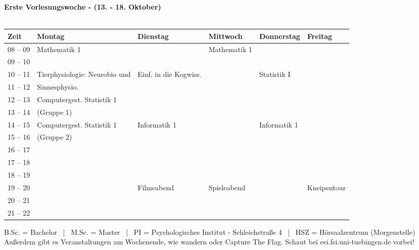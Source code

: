 \textbf{Erste Vorlesungswoche - (13. - 18. Oktober)}\\
\\
\begin{tabular}{|l|p{}|p{}|p{}|p{}|p{}|} \hline
	Zeit & Montag & Dienstag & Mittwoch & Donnerstag & Freitag \\ 
	\hline \hline
 08 -- 09 & \footnotesize{Mathematik 1} & & \footnotesize{Mathematik 1} & & \\ \cline{1-1}
 09 -- 10 & & & & & \\ \cline{1-5}
 10 -- 11 & \footnotesize{Tierphysiologie: Neurobio und} & \footnotesize{Einf. in die Kogwiss.} & & \footnotesize{Statistik I} & \\ \cline{1-1} 
 11 -- 12 & \footnotesize{Sinnesphysio.} &  & &  & \\ \cline{1-3} \cline{5-5}
 12 -- 13 & \footnotesize{Computergest. Statistik 1}& & & & \\ \cline{1-1}
 13 -- 14 & \footnotesize{(Gruppe 1)}& & & & \\ \cline{1-3} \cline{5-5}
 14 -- 15 & \footnotesize{Computergest. Statistik 1} & \footnotesize{Informatik 1} & & \footnotesize{Informatik 1} & \\  \cline {1-1}
 15 -- 16 & \footnotesize{(Gruppe 2)} &  & & & \\ \cline{1-3} \cline{5-5}
 16 -- 17 & & & & & \\ \cline{1-1}
 17 -- 18 & & & & & \\ \cline{1-1}
 18 -- 19 & & & & & \\ \cline{1-1}
 19 -- 20 & & \cellcolor{lightlightgray} \footnotesize{Filmeabend} &\cellcolor{lightlightgray} \footnotesize{Spieleabend} & &\cellcolor{lightlightgray} \footnotesize{Kneipentour} \\ \cline{1-1}
 20 -- 21 & &\cellcolor{lightlightgray} &\cellcolor{lightlightgray}  & &\cellcolor{lightlightgray}\\ \cline{1-1}
 21 -- 22 & &\cellcolor{lightlightgray} & \cellcolor{lightlightgray} & &\cellcolor{lightlightgray}\\ \hline
\end{tabular}

\scriptsize{B.Sc. = Bachelor ~|~ M.Sc. = Master ~|~ PI = Psychologisches Institut - Schleichstraße 4 ~|~ HSZ = Hörsaalzentrum (Morgenstelle)}
\scriptsize{Außerdem gibt es Veranstaltungen am Wochenende, wie wandern oder Capture The Flag. Schaut bei eei.fsi.uni-tuebingen.de vorbei!}

